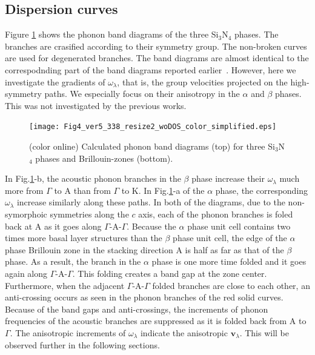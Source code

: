 \documentclass[twocolumn,amsmath,amssymb,a4paper,prb,superscriptaddress,floatfix]{revtex4-1}
\begin{document}
\subsection{Dispersion curves}

Figure \ref{fig:Fig4_ver5_338} shows the phonon band diagrams of the three
Si$_3$N$_4$ phases. The branches are crasified according to their symmetry
group. The non-broken curves are used for degenerated branches. The band
diagrams are almost identical to the correspodnding part of the band diagrams
reported earlier~\cite{kuwabara,xu}. However, here we investigate the gradients
of $\omega_\lambda$, that is, the group velocities projected on the
high-symmetry paths. We especially focus on their anisotropy in the $\alpha$ and
$\beta$ phases. This was not investigated by the previous works.

\begin{figure}[ht]
 \begin{center}
	 \texttt{[image: Fig4\_ver5\_338\_resize2\_woDOS\_color\_simplified.eps]}
  \caption{(color online) Calculated phonon band
	  diagrams (top) for three Si$_3$N$_4$ phases and Brillouin-zones (bottom).
  \label{fig:Fig4_ver5_338} }
 \end{center}
\end{figure}

In Fig.\ref{fig:Fig4_ver5_338}-b, the acoustic phonon branches in the $\beta$
phase increase their $\omega_\lambda$ much more from $\Gamma$ to A than from
$\Gamma$ to K. In Fig.\ref{fig:Fig4_ver5_338}-a of the $\alpha$ phase, the
corresponding $\omega_\lambda$ increase similarly along these paths.  In both of
the diagrams, due to the non-symorphoic symmetries along the $c$ axis, each of
the phonon branches is foled back at A as it goes along $\Gamma$-A-$\Gamma$.
Because the $\alpha$ phase unit cell contains two times more basal layer
structures than the $\beta$ phase unit cell, the edge of the $\alpha$ phase
Brillouin zone in the stacking direction A is half as far as that of the $\beta$
phase. As a result, the branch in the $\alpha$ phase is one more time folded and
it goes again along $\Gamma$-A-$\Gamma$. This folding creates a band gap at the
zone center. Furthermore, when the adjacent $\Gamma$-A-$\Gamma$ folded branches
are close to each other, an anti-crossing occurs as seen in the phonon branches
of the red solid curves.  Because of the band gaps and anti-crossings, the
increments of phonon frequencies of the acoustic branches are suppressed as it
is folded back from A to $\Gamma$.  The anisotropic increments of
$\omega_\lambda$ indicate the anisotropic $\mathbf{v}_\lambda$.  This will be
observed further in the following sections.  
\end{document}
